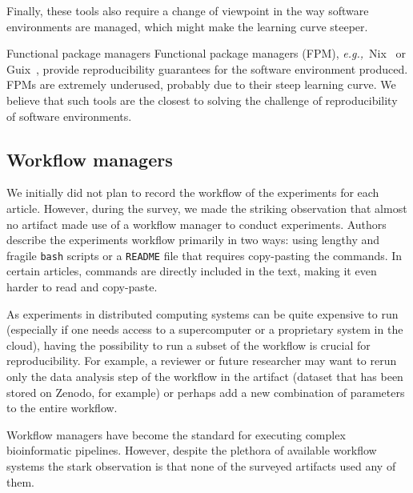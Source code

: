 \documentclass[sigconf,natbib=false]{acmart}
\newcommand{\eg}{\emph{e.g.,}}
\newcommand{\fmc}[1]{{\color{magenta} #1}} %
\begin{document}
Finally, these tools also require a change of viewpoint in the way software environments are managed, which might make the learning curve steeper. %

\begin{lesson}{Functional package managers}{}
  Functional package managers (FPM), \eg\ Nix\ \cite{dolstra_nix_2004} or Guix\ \cite{courtes_functional_2013}, provide reproducibility guarantees for the software environment produced.
  FPMs are extremely underused, probably due to their steep learning curve.
  We believe that such tools are the closest to solving the challenge of reproducibility of software environments.
\end{lesson}

\subsection{Workflow managers}\label{sec:sop:workflow}

We initially did not plan to record the workflow of the experiments for each article. 
However, during the survey, we made the striking observation that almost no artifact made use of a workflow manager to conduct experiments. 
Authors describe the experiments workflow primarily in two ways: 
using lengthy and fragile \texttt{bash} scripts or a \texttt{README} file that requires copy-pasting the commands.
In certain articles, commands are directly included in the text, making it even harder to read and copy-paste.

As experiments in distributed computing systems can be quite expensive to run (especially if one needs access to a supercomputer or a proprietary system in the cloud), having the possibility to run a subset of the workflow is crucial for reproducibility.
For example, a reviewer or future researcher may want to rerun only the data analysis step of the workflow in the artifact (dataset that has been stored on Zenodo, for example) or perhaps add a new combination of parameters to the entire workflow. 

Workflow managers \cite{wratten2021reproducible} have become the standard for executing complex bioinformatic pipelines.
However, despite the plethora of available workflow systems \cite{rafael_ferreira_da_silva_2023_7750670, koster2012snakemake, di2017nextflow, deelman2015pegasus, amstutz2016common, strozzi2019scalable, vivian2017toil} the stark observation is that none of the surveyed artifacts used any of them.
\end{document}
